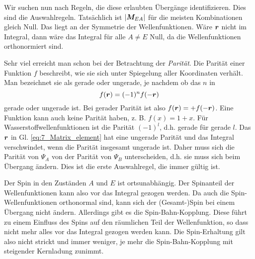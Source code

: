 Wir suchen nun nach Regeln, die diese erlaubten Übergänge identifizieren. Dies sind die Auswahlregeln. Tatsächlich ist $|\boldsymbol{M}_{EA}|$ für die meisten Kombinationen gleich Null. Das liegt an der Symmetrie der Wellenfunktionen. Wäre $\boldsymbol{r}$ nicht im Integral, dann wäre das Integral für alle $A \neq E$ Null, da die Wellenfunktionen orthonormiert sind.

Sehr viel erreicht man schon bei der Betrachtung der  \emph{Parität}. Die Parität einer Funktion $f$ beschreibt, wie sie sich unter Spiegelung aller Koordinaten verhält. Man bezeichnet sie als gerade oder ungerade, je nachdem ob das $n$ in 
\begin{equation}
    f(\boldsymbol{r}) = (-1)^n f(- \boldsymbol{r})
\end{equation}
gerade oder ungerade ist. Bei gerader Parität ist also $f(\boldsymbol{r}) = + f(- \boldsymbol{r}) $.
Eine Funktion kann auch keine Parität haben, z. B. $f(x) = 1 + x$. Für Wasserstoffwellenfunktionen ist die Parität $(-1)^l$, d.h. gerade für gerade $l$. Das $\boldsymbol{r}$ in Gl. \ref{eq:7_Matrix_element} hat eine ungerade Parität und das Integral verschwindet, wenn die Parität insgesamt ungerade ist. Daher muss sich die Parität von $\Psi_A$ von der Parität von $\Psi_B$ unterscheiden, d.h. sie muss sich beim Übergang ändern. Dies ist die erste Auswahlregel, die immer gültig ist.

Der Spin in den Zuständen $A$ und $E$ ist ortsunabhängig. Der Spinanteil der Wellenfunktionen kann also vor das Integral gezogen werden. Da auch die Spin-Wellenfunktionen orthonormal sind, kann sich der (Gesamt-)Spin bei einem Übergang nicht ändern. Allerdings gibt es die Spin-Bahn-Kopplung. Diese führt zu einem Einfluss des Spins auf den räumlichen Teil der Wellenfunktion, so dass nicht mehr alles vor das Integral gezogen werden kann. Die Spin-Erhaltung gilt also nicht strickt und immer weniger, je mehr die Spin-Bahn-Kopplung mit steigender Kernladung zunimmt.


